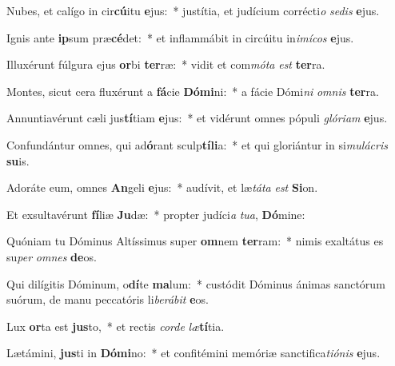 \item Nubes, et calígo in cir\textbf{cú}itu \textbf{e}jus:~* justítia, et judícium corrécti\textit{o} \textit{se}\textit{dis} \textbf{e}jus.
\item Ignis ante \textbf{ip}sum præ\textbf{cé}det:~* et inflammábit in circúitu in\textit{i}\textit{mí}\textit{cos} \textbf{e}jus.
\item Illuxérunt fúlgura ejus \textbf{or}bi \textbf{ter}ræ:~* vidit et com\textit{mó}\textit{ta} \textit{est} \textbf{ter}ra.
\item Montes, sicut cera fluxérunt a \textbf{fá}cie \textbf{Dó}\textbf{mi}ni:~* a fácie Dómi\textit{ni} \textit{om}\textit{nis} \textbf{ter}ra.
\item Annuntiavérunt cæli jus\textbf{tí}tiam \textbf{e}jus:~* et vidérunt omnes pópuli \textit{gló}\textit{ri}\textit{am} \textbf{e}jus.
\item Confundántur omnes, qui ad\textbf{ó}rant sculp\textbf{tí}\textbf{li}a:~* et qui gloriántur in si\textit{mu}\textit{lá}\textit{cris} \textbf{su}is.
\item Adoráte eum, omnes \textbf{An}geli \textbf{e}jus:~* audívit, et læ\textit{tá}\textit{ta} \textit{est} \textbf{Si}on.
\item Et exsultavérunt \textbf{fí}liæ \textbf{Ju}dæ:~* propter judíci\textit{a} \textit{tu}\textit{a}, \textbf{Dó}mine:
\item Quóniam tu Dóminus Altíssimus super \textbf{om}nem \textbf{ter}ram:~* nimis exaltátus es su\textit{per} \textit{om}\textit{nes} \textbf{de}os.
\item Qui dilígitis Dóminum, o\textbf{dí}te \textbf{ma}lum:~* custódit Dóminus ánimas sanctórum suórum, de manu peccatóris li\textit{be}\textit{rá}\textit{bit} \textbf{e}os.
\item Lux \textbf{or}ta est \textbf{jus}to,~* et rectis \textit{cor}\textit{de} \textit{læ}\textbf{tí}tia.
\item Lætámini, \textbf{jus}ti in \textbf{Dó}\textbf{mi}no:~* et confitémini memóriæ sanctifica\textit{ti}\textit{ó}\textit{nis} \textbf{e}jus.
